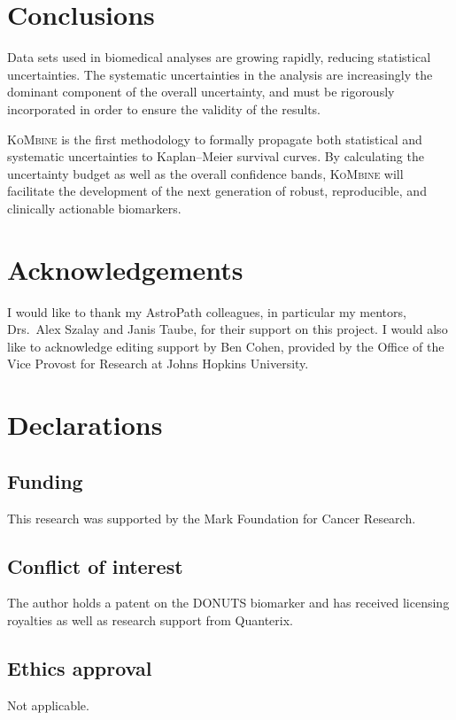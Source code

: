 \documentclass[pdflatex,sn-basic]{sn-jnl}%
\theoremstyle{thmstyleone}%
\theoremstyle{thmstyletwo}%
\theoremstyle{thmstylethree}%
\newcommand{\KM}{Kaplan--Meier} %
\newcommand{\KoMbine}{\textsc{KoMbine}}
\begin{document}
\section{Conclusions}

Data sets used in biomedical analyses are growing rapidly, reducing statistical uncertainties.  The systematic uncertainties in the analysis are increasingly the dominant component of the overall uncertainty, and must be rigorously incorporated in order to ensure the validity of the results.

\KoMbine{} is the first methodology to formally propagate both statistical and systematic uncertainties to \KM{} survival curves.  By calculating the uncertainty budget as well as the overall confidence bands, \KoMbine{} will facilitate the development of the next generation of robust, reproducible, and clinically actionable biomarkers.

\backmatter%
\section*{Acknowledgements}

I would like to thank my AstroPath colleagues, in particular my mentors, Drs.~Alex Szalay and Janis Taube, for their support on this project. I would also like to acknowledge editing support by Ben Cohen, provided by the Office of the Vice Provost for Research at Johns Hopkins University.

\section*{Declarations}

\subsection*{Funding}
This research was supported by the Mark Foundation for Cancer Research.

\subsection*{Conflict of interest}
The author holds a patent on the DONUTS biomarker and has received licensing royalties as well as research support from Quanterix.

\subsection*{Ethics approval}
Not applicable.
\end{document}
